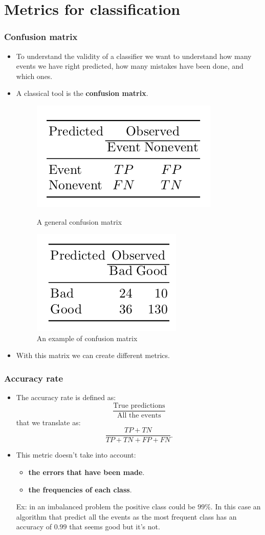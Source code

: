 \documentclass[9pt]{beamer}
\begin{document}
\section{Metrics for classification}
\begin{frame}
\frametitle{Confusion matrix}
\begin{itemize}
\item To understand the validity of a classifier we want to understand how many events we have right predicted, how many mistakes have been done, and which ones.
\item A classical tool is the \textbf{confusion matrix}.
\begin{figure}[ht]
\includegraphics[scale=0.25]{images/confusionmatrix.png}
\caption{A general confusion matrix}

\includegraphics[scale=0.30]{images/exampleConfusionMatrix.png}
\caption{An example of confusion matrix}
\end{figure}
\item With this matrix we can create different metrics.
\end{itemize}

\end{frame}


\begin{frame}
\frametitle{Accuracy rate}
\begin{itemize}
\item The accuracy rate is defined as:
$$
\dfrac{\mbox{True predictions}}{\mbox{All the events}}
$$
that we translate as:
$$\dfrac{TP + TN}{TP + TN + FP + FN}.$$
\item This metric doesn't take into account:
\begin{itemize}
\item \textbf{the errors that have been made}.
\item \textbf{the frequencies of each class}.
\end{itemize}
Ex: in an imbalanced problem the positive class could be $99\%$. In this case an algorithm that predict all the events as the most frequent class has an accuracy of $0.99$ that seems good but it's not.
\end{itemize}
\end{frame}
\end{document}
